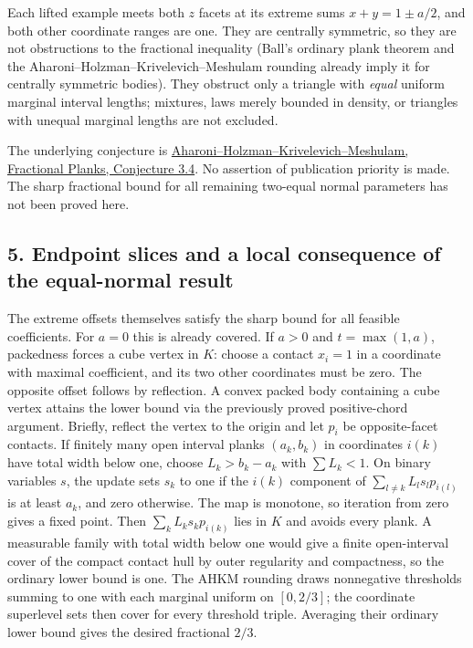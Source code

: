 \documentclass[
  10pt,
]{article}
\begin{document}
Each lifted example meets both \(z\) facets at its extreme sums
\(x+y=1\pm a/2\), and both other coordinate ranges are one. They are
centrally symmetric, so they are not obstructions to the fractional
inequality (Ball's ordinary plank theorem and the
Aharoni--Holzman--Krivelevich--Meshulam rounding already imply it for
centrally symmetric bodies). They obstruct only a triangle with
\emph{equal} uniform marginal interval lengths; mixtures, laws merely
bounded in density, or triangles with unequal marginal lengths are not
excluded.

The underlying conjecture is
\href{https://doi.org/10.1007/s00454-001-0088-x}{Aharoni--Holzman--Krivelevich--Meshulam,
Fractional Planks, Conjecture 3.4}. No assertion of publication priority
is made. The sharp fractional bound for all remaining two-equal normal
parameters has not been proved here.

\subsection{5. Endpoint slices and a local consequence of the
equal-normal
result}\label{endpoint-slices-and-a-local-consequence-of-the-equal-normal-result}

The extreme offsets themselves satisfy the sharp bound for all feasible
coefficients. For \(a=0\) this is already covered. If \(a>0\) and
\(t=\max(1,a)\), packedness forces a cube vertex in \(K\): choose a
contact \(x_i=1\) in a coordinate with maximal coefficient, and its two
other coordinates must be zero. The opposite offset follows by
reflection. A convex packed body containing a cube vertex attains the
lower bound via the previously proved positive-chord argument. Briefly,
reflect the vertex to the origin and let \(p_i\) be opposite-facet
contacts. If finitely many open interval planks \((a_k,b_k)\) in
coordinates \(i(k)\) have total width below one, choose \(L_k>b_k-a_k\)
with \(\sum L_k<1\). On binary variables \(s\), the update sets \(s_k\)
to one if the \(i(k)\) component of \(\sum_{l\neq k}L_ls_lp_{i(l)}\) is
at least \(a_k\), and zero otherwise. The map is monotone, so iteration
from zero gives a fixed point. Then \(\sum_k L_ks_kp_{i(k)}\) lies in
\(K\) and avoids every plank. A measurable family with total width below
one would give a finite open-interval cover of the compact contact hull
by outer regularity and compactness, so the ordinary lower bound is one.
The AHKM rounding draws nonnegative thresholds summing to one with each
marginal uniform on \([0,2/3]\); the coordinate superlevel sets then
cover for every threshold triple. Averaging their ordinary lower bound
gives the desired fractional \(2/3\).
\end{document}
